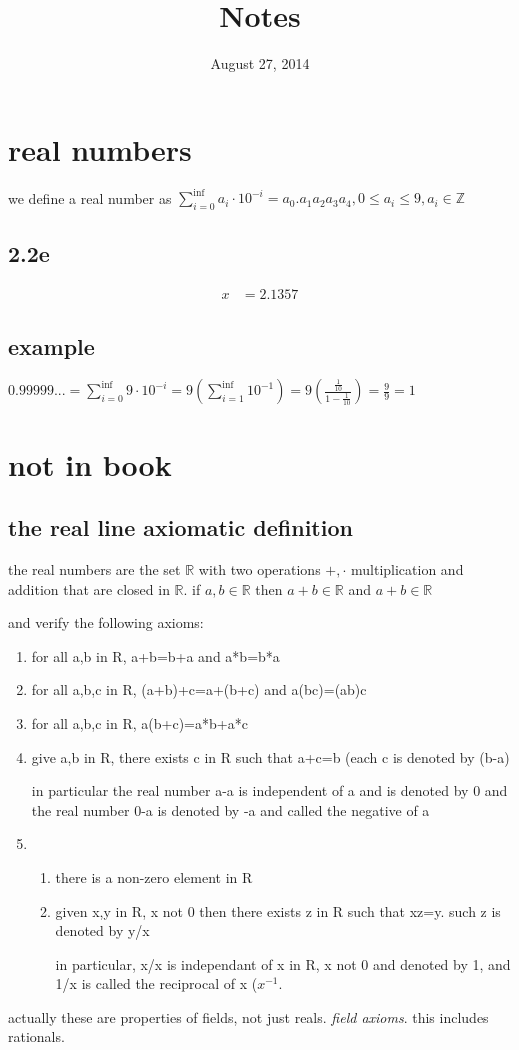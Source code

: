 \documentclass[letterpaper]{article}
\begin{document}
\title{Notes}
\date{August 27, 2014}
\maketitle
\section*{real numbers}
we define a real number as $\sum\limits_{i=0}^{\inf}{a_i\cdot 10^{-i}}=a_0.a_1a_2a_3a_4, 0\le a_i\le 9, a_i\in \mathbb{Z}$
\subsection*{2.2e}
\begin{align*}
  x&=2.1357
\end{align*}
\subsection*{example}
$0.99999...=\sum\limits_{i=0}^{\inf}{9\cdot 10^{-i}}=9\left(\sum\limits_{i=1}^{\inf}{10^{-1}}\right)=9\left(\frac{\frac{1}{10}}{1-\frac{1}{10}}\right)=\frac{9}{9}=1$
\section*{not in book}
\subsection*{the real line axiomatic definition}
the real numbers are the set $\mathbb{R}$ with two operations $+,\cdot$ multiplication and addition that are closed in $\mathbb{R}$. if $a,b\in \mathbb{R}$ then $a+b\in \mathbb{R}$ and $a+b\in \mathbb{R}$

and verify the following axioms:
\begin{enumerate}
\item
for all a,b in R, a+b=b+a and a*b=b*a
\item
for all a,b,c in R, (a+b)+c=a+(b+c) and a(bc)=(ab)c
\item
for all a,b,c in R, a(b+c)=a*b+a*c
\item
give a,b in R, there exists c in R such that a+c=b (each c is denoted by (b-a)

in particular the real number a-a is independent of a and is denoted by 0 and the real number 0-a is denoted by -a and called the negative of a
\item
\begin{enumerate}
\item
there is a non-zero element in R
\item
given x,y in R, x not 0 then there exists z in R such that xz=y. such z is denoted by y/x

in particular, x/x is independant of x in R, x not 0 and denoted by 1, and 1/x is called the reciprocal of x ($x^{-1}$.
\end{enumerate}
\end{enumerate}
actually these are properties of fields, not just reals. \emph{field axioms}. this includes rationals.
\end{document}
